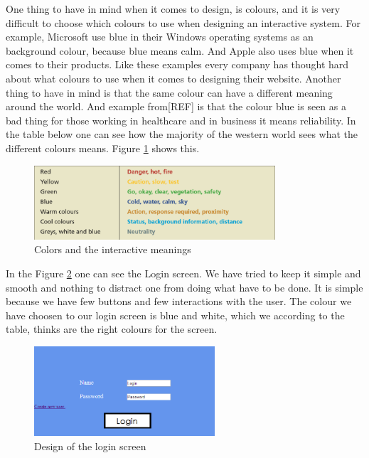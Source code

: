 One thing to have in mind when it comes to design, is colours, and it is very difficult to choose which colours to use when designing an interactive system. For example, Microsoft use blue in their Windows operating systems as an background colour, because blue means calm. And Apple also uses blue when it comes to their products. Like these examples every company has thought hard about what colours to use when it comes to designing their website. 
Another thing to have in mind is that the same colour can have a different meaning around the world. And example from[REF] is that the colour blue is seen as a bad thing for those working in healthcare and in business it means reliability.
In the table below one can see how the majority of the western world sees what the different colours means. Figure \ref{Colors} shows this.

\begin{figure}[htb]
\centering
\includegraphics[width=0.8\textwidth]{Images/Colors.png}
\caption{Colors and the interactive meanings}
\label{Colors}
\end{figure}

In the Figure \ref{Login} one can see the Login screen. We have tried to keep it simple and smooth and nothing to distract one from doing what have to be done. It is simple because we have few buttons and few interactions with the user. The colour we have choosen to our login screen is blue and white, which we according to the table, thinks are the right colours for the screen.

\begin{figure}[htb]
\centering
\includegraphics[width=0.6\textwidth]{Images/Login.png}
\caption{Design of the login screen}
\label{Login}
\end{figure}

